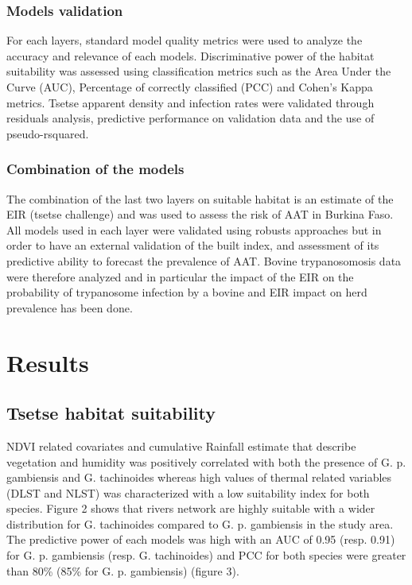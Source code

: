 \documentclass[10pt]{article}
\begin{document}
\subsubsection*{Models validation}
\label{unnumbered-12}
For each layers, standard model quality metrics were used to analyze the accuracy and relevance of each models. 
Discriminative power of the habitat suitability was assessed using classification metrics such as the Area Under the Curve (AUC), Percentage of correctly classified (PCC) and Cohen's Kappa metrics.
Tsetse apparent density and infection rates were validated through residuals analysis, predictive performance on validation data and the use of pseudo-rsquared.

\subsubsection*{Combination of the models}
\label{unnumbered-13}
The combination of the last two layers on suitable habitat is an estimate of the EIR (tsetse challenge) and was used to assess the risk of AAT in Burkina Faso.
All models used in each layer were validated using robusts approaches but in order to have an external validation of the built index,
and assessment of its predictive ability to forecast the prevalence of AAT. Bovine trypanosomosis data were therefore analyzed and in particular
the impact of the EIR on the probability of trypanosome infection by a bovine and EIR impact on herd prevalence has been done.

\section*{Results}
\label{unnumbered-14}
\subsection*{Tsetse habitat suitability}
\label{unnumbered-15}
NDVI related covariates and cumulative Rainfall estimate that describe vegetation and humidity was positively correlated with both the presence
of G. p. gambiensis and G. tachinoides whereas high values of thermal related variables (DLST and NLST) was
characterized with a low suitability index for both species. Figure 2 shows that rivers network are highly suitable with a wider
distribution for G. tachinoides compared to G. p. gambiensis in the study area.
The predictive power of each models was high with an AUC of 0.95 (resp. 0.91) for G. p. gambiensis (resp. G. tachinoides) and
PCC for both species were greater than 80\% (85\% for G. p. gambiensis) (figure 3).
\end{document}
